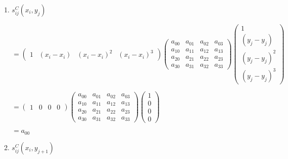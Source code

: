 \documentclass[11pt]{article}
\begin{document}
  \begin{enumerate}[label=\textbf{\arabic*)}]
    \item $s_{ij}^C(x_i, y_j)$

    \begin{flushleft}

      $= \begin{pmatrix}
        1 & (x_i - x_i) & (x_i - x_i)^2 & (x_i - x_i)^3
      \end{pmatrix}
      \begin{pmatrix}
        a_{00}  & a_{01} & a_{02} & a_{03} \\
        a_{10}  & a_{11} & a_{12} & a_{13} \\
        a_{20}  & a_{21} & a_{22} & a_{23} \\
        a_{30}  & a_{31} & a_{32} & a_{33}
      \end{pmatrix}
      \begin{pmatrix}
        1  \\
        (y_j - y_j) \\
        (y_j - y_j)^2  \\
        (y_j - y_j)^3
      \end{pmatrix}$


      $= \begin{pmatrix}
        1 & 0 & 0 & 0
      \end{pmatrix}
      \begin{pmatrix}
        a_{00}  & a_{01} & a_{02} & a_{03} \\
        a_{10}  & a_{11} & a_{12} & a_{13} \\
        a_{20}  & a_{21} & a_{22} & a_{23} \\
        a_{30}  & a_{31} & a_{32} & a_{33}
      \end{pmatrix}
      \begin{pmatrix}
        1  \\
        0  \\
        0  \\
        0
      \end{pmatrix}$

      $= a_{00}$
    \end{flushleft}

    \item $s_{ij}^C(x_i, y_{j + 1})$

    \begin{flushleft}


\end{flushleft}
\end{enumerate}
\end{document}

